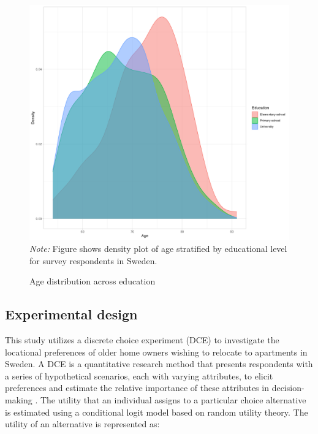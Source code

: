 \documentclass[3p,12pt ]{elsarticle}
\begin{document}
\begin{figure}[H]

\includegraphics[width=\textwidth]{figures/edu_den.png}
\vspace{1mm}
\footnotesize \textit{Note:} Figure shows density plot of age stratified by educational level for survey respondents in Sweden.
\caption{Age distribution across education \label{fig:edu}}
\end{figure}



\newpage

\subsection{Experimental design}

This study utilizes a discrete choice experiment (DCE) to investigate the locational preferences of older home owners wishing to relocate to apartments in Sweden.
A DCE is a quantitative research method that presents respondents with a series of hypothetical scenarios, each with varying attributes, to elicit preferences and estimate the relative importance of these attributes in decision-making \citep{lancsarConductingDiscreteChoice2008}.
The utility that an individual assigns to a particular choice alternative is estimated using a conditional logit model based on random utility theory.
The utility of an alternative is represented as:
\end{document}
